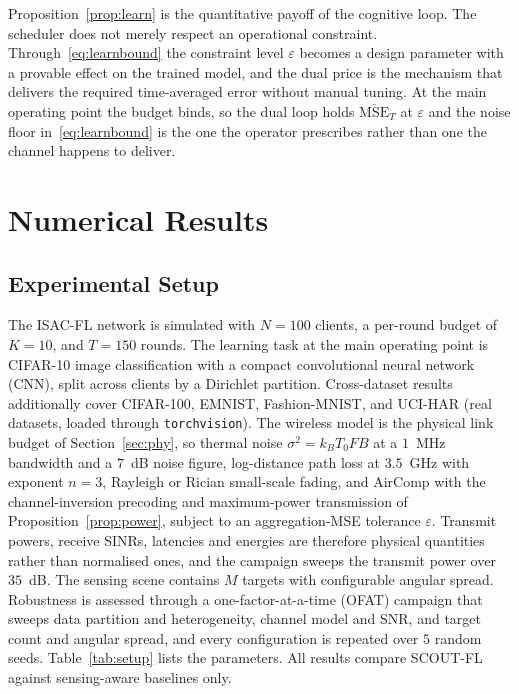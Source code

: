 \documentclass[lettersize,journal]{IEEEtran}
\newcommand{\scout}{SCOUT-FL}
\begin{document}
Proposition~\ref{prop:learn} is the quantitative payoff of the cognitive loop. The scheduler does not merely respect an operational constraint. Through~\eqref{eq:learnbound} the constraint level $\varepsilon$ becomes a design parameter with a provable effect on the trained model, and the dual price is the mechanism that delivers the required time-averaged error without manual tuning. At the main operating point the budget binds, so the dual loop holds $\overline{\mathrm{MSE}}_T$ at $\varepsilon$ and the noise floor in~\eqref{eq:learnbound} is the one the operator prescribes rather than one the channel happens to deliver.%

\section{Numerical Results}\label{sec:results}

\subsection{Experimental Setup}
The ISAC-FL network is simulated with $N=100$ clients, a per-round budget of $K=10$, and $T=150$ rounds. The learning task at the main operating point is CIFAR-10 image classification with a compact convolutional neural network (CNN), split across clients by a Dirichlet partition. Cross-dataset results additionally cover CIFAR-100, EMNIST, Fashion-MNIST, and UCI-HAR (real datasets, loaded through \texttt{torchvision}). The wireless model is the physical link budget of Section~\ref{sec:phy}, so thermal noise $\sigma^{2}=k_{B}T_{0}FB$ at a $1$~MHz bandwidth and a $7$~dB noise figure, log-distance path loss at $3.5$~GHz with exponent $n=3$, Rayleigh or Rician small-scale fading, and AirComp with the channel-inversion precoding and maximum-power transmission of Proposition~\ref{prop:power}, subject to an aggregation-MSE tolerance $\varepsilon$. Transmit powers, receive SINRs, latencies and energies are therefore physical quantities rather than normalised ones, and the campaign sweeps the transmit power over $35$~dB. The sensing scene contains $M$ targets with configurable angular spread. Robustness is assessed through a one-factor-at-a-time (OFAT) campaign that sweeps data partition and heterogeneity, channel model and SNR, and target count and angular spread, and every configuration is repeated over $5$ random seeds. Table~\ref{tab:setup} lists the parameters. All results compare \scout{} against sensing-aware baselines only.
\end{document}
